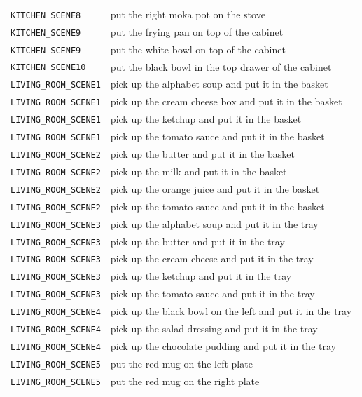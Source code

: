 \begin{table}[t]
\begin{tabular}{ll}
\texttt{KITCHEN\_SCENE8}      & put the right moka pot on the stove \\
\texttt{KITCHEN\_SCENE9}      & put the frying pan on top of the cabinet \\
\texttt{KITCHEN\_SCENE9}      & put the white bowl on top of the cabinet \\
\texttt{KITCHEN\_SCENE10}     & put the black bowl in the top drawer of the cabinet \\
\texttt{LIVING\_ROOM\_SCENE1} & pick up the alphabet soup and put it in the basket \\
\texttt{LIVING\_ROOM\_SCENE1} & pick up the cream cheese box and put it in the basket \\
\texttt{LIVING\_ROOM\_SCENE1} & pick up the ketchup and put it in the basket \\
\texttt{LIVING\_ROOM\_SCENE1} & pick up the tomato sauce and put it in the basket \\
\texttt{LIVING\_ROOM\_SCENE2} & pick up the butter and put it in the basket \\
\texttt{LIVING\_ROOM\_SCENE2} & pick up the milk and put it in the basket \\
\texttt{LIVING\_ROOM\_SCENE2} & pick up the orange juice and put it in the basket \\
\texttt{LIVING\_ROOM\_SCENE2} & pick up the tomato sauce and put it in the basket \\
\texttt{LIVING\_ROOM\_SCENE3} & pick up the alphabet soup and put it in the tray \\
\texttt{LIVING\_ROOM\_SCENE3} & pick up the butter and put it in the tray \\
\texttt{LIVING\_ROOM\_SCENE3} & pick up the cream cheese and put it in the tray \\
\texttt{LIVING\_ROOM\_SCENE3} & pick up the ketchup and put it in the tray \\
\texttt{LIVING\_ROOM\_SCENE3} & pick up the tomato sauce and put it in the tray \\
\texttt{LIVING\_ROOM\_SCENE4} & pick up the black bowl on the left and put it in the tray \\
\texttt{LIVING\_ROOM\_SCENE4} & pick up the salad dressing and put it in the tray \\
\texttt{LIVING\_ROOM\_SCENE4} & pick up the chocolate pudding and put it in the tray \\
\texttt{LIVING\_ROOM\_SCENE5} & put the red mug on the left plate \\
\texttt{LIVING\_ROOM\_SCENE5} & put the red mug on the right plate \\

\end{tabular}
\end{table}
